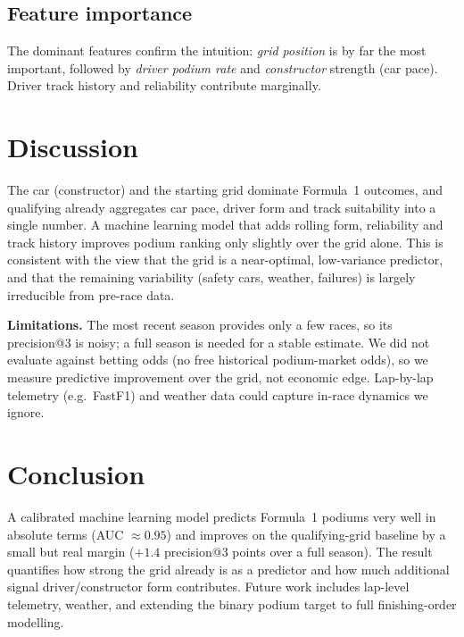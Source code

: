 \documentclass[10pt,twocolumn]{article}
\begin{document}
\subsection{Feature importance}
The dominant features confirm the intuition: \emph{grid position} is by far the
most important, followed by \emph{driver podium rate} and \emph{constructor}
strength (car pace). Driver track history and reliability contribute marginally.

\section{Discussion}
The car (constructor) and the starting grid dominate Formula~1 outcomes, and
qualifying already aggregates car pace, driver form and track suitability into a
single number. A machine learning model that adds rolling form, reliability and
track history improves podium ranking only slightly over the grid alone. This is
consistent with the view that the grid is a near-optimal, low-variance predictor,
and that the remaining variability (safety cars, weather, failures) is largely
irreducible from pre-race data.

\textbf{Limitations.} The most recent season provides only a few races, so its
precision@3 is noisy; a full season is needed for a stable estimate. We did not
evaluate against betting odds (no free historical podium-market odds), so we
measure predictive improvement over the grid, not economic edge. Lap-by-lap
telemetry (e.g.\ FastF1) and weather data could capture in-race dynamics we
ignore.

\section{Conclusion}
A calibrated machine learning model predicts Formula~1 podiums very well in
absolute terms (AUC $\approx 0.95$) and improves on the qualifying-grid baseline
by a small but real margin ($+1.4$ precision@3 points over a full season). The
result quantifies how strong the grid already is as a predictor and how much
additional signal driver/constructor form contributes. Future work includes
lap-level telemetry, weather, and extending the binary podium target to full
finishing-order modelling.

\end{document}
